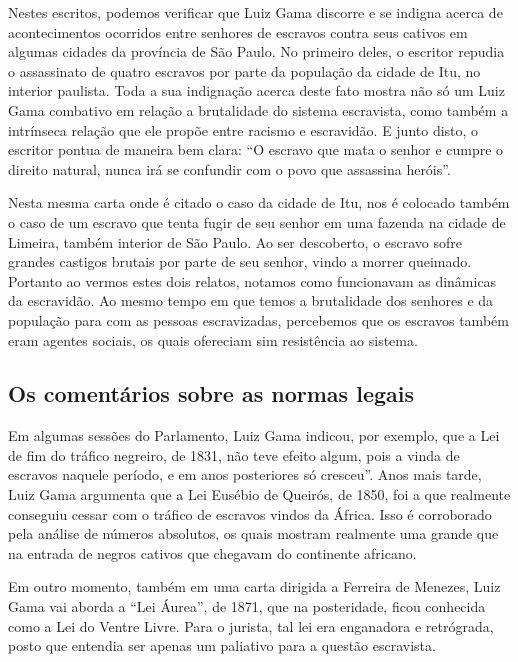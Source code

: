 \documentclass[12pt]{extarticle}
\begin{document}




Nestes escritos, podemos verificar que Luiz Gama discorre e se indigna
acerca de acontecimentos ocorridos entre senhores de escravos contra
seus cativos em algumas cidades da província de São Paulo. No primeiro
deles, o escritor repudia o assassinato de quatro escravos por parte da
população da cidade de Itu, no interior paulista. Toda a sua indignação
acerca deste fato mostra não só um Luiz Gama combativo em relação a
brutalidade do sistema escravista, como também a intrínseca relação que
ele propõe entre racismo e escravidão. E junto disto, o escritor pontua
de maneira bem clara: ``O escravo que mata o senhor e cumpre o direito
natural, nunca irá se confundir com o povo que assassina heróis''.

Nesta mesma carta onde é citado o caso da cidade de Itu, nos é colocado
também o caso de um escravo que tenta fugir de seu senhor em uma fazenda
na cidade de Limeira, também interior de São Paulo. Ao ser descoberto, o
escravo sofre grandes castigos brutais por parte de seu senhor, vindo a
morrer queimado. Portanto ao vermos estes dois relatos, notamos como
funcionavam as dinâmicas da escravidão. Ao mesmo tempo em que temos a
brutalidade dos senhores e da população para com as pessoas
escravizadas, percebemos que os escravos também eram agentes sociais, os
quais ofereciam sim resistência ao sistema.

\subsection{Os comentários sobre as normas legais}

Em algumas sessões do Parlamento, Luiz Gama indicou, por exemplo, que a
Lei de fim do tráfico negreiro, de 1831, não teve efeito algum, pois a
vinda de escravos naquele período, e em anos posteriores só cresceu''.
Anos mais tarde, Luiz Gama argumenta que a Lei Eusébio de Queirós, de
1850, foi a que realmente conseguiu cessar com o tráfico de escravos
vindos da África. Isso é corroborado pela análise de números absolutos,
os quais mostram realmente uma grande que na entrada de negros cativos
que chegavam do continente africano.

Em outro momento, também em uma carta dirigida a Ferreira de Menezes,
Luiz Gama vai aborda a ``Lei Áurea'', de 1871, que na posteridade, ficou
conhecida como a Lei do Ventre Livre. Para o jurista, tal lei era
enganadora e retrógrada, posto que entendia ser apenas um paliativo para
a questão escravista.
\end{document}
